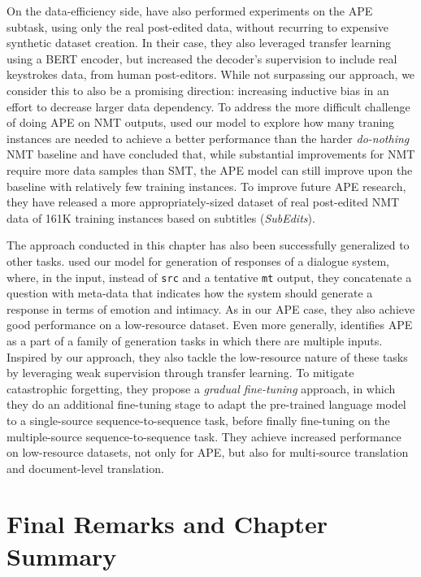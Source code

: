 On the data-efficiency side,
\citet{gois2020LearningNonMonotonicAutomatic} have also performed
experiments on the APE subtask, using only the real post-edited data,
without recurring to expensive synthetic dataset creation. In their
case, they also leveraged transfer learning using a BERT encoder, but
increased the decoder's supervision to include real keystrokes data,
from human post-editors. While not surpassing our approach, we
consider this to also be a promising direction: increasing inductive
bias in an effort to decrease larger data dependency. To address the
more difficult challenge of doing APE on NMT outputs,
\citet{chollampatt2020CanAutomaticPostEditing} used our model to
explore how many traning instances are needed to achieve a better
performance than the harder \emph{do-nothing} NMT baseline and have
concluded that, while substantial improvements for NMT require more
data samples than SMT, the APE model can still improve upon the
baseline with relatively few training instances. To improve future
APE research, they have released a more appropriately-sized dataset
of real post-edited NMT data of 161K training instances based on
subtitles (\emph{SubEdits}).

The approach conducted in this chapter has also been successfully
generalized to other tasks. \citet{kodama2020GeneratingResponsesthat}
used our model for generation of responses of a dialogue system,
where, in the input, instead of \texttt{src} and a tentative
\texttt{mt} output, they concatenate a question with meta-data that
indicates how the system should generate a response in terms of
emotion and intimacy. As in our APE case, they also achieve good
performance on a low-resource dataset. Even more generally,
\citet{huang2021TransferLearningSequence} identifies APE as a part of
a family of generation tasks in which there are multiple inputs.
Inspired by our approach, they also tackle the low-resource nature of
these tasks by leveraging weak supervision through transfer learning.
To mitigate catastrophic forgetting, they propose a \emph{gradual
    fine-tuning} approach, in which they do an additional fine-tuning
stage to adapt the pre-trained language model to a single-source
sequence-to-sequence task, before finally fine-tuning on the
multiple-source sequence-to-sequence task. They achieve increased
performance on low-resource datasets, not only for APE, but also for
multi-source translation and document-level translation.

\section{Final Remarks and Chapter Summary}

